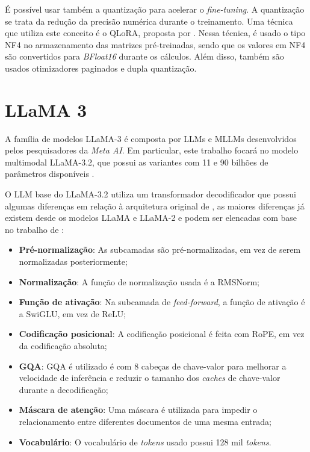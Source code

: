 
É possível usar também a quantização para acelerar o \textit{fine-tuning}. A quantização se trata da redução da precisão numérica durante o treinamento. Uma técnica que
utiliza este conceito é o \ac{QLoRA}, proposta por \textcite{qlora}. Nessa técnica, é usado o tipo \ac{NF4} no armazenamento das matrizes pré-treinadas, sendo que os
valores em \ac{NF4} são convertidos para \textit{BFloat16} durante os cálculos. Além disso, também são usados otimizadores paginados e dupla quantização.

\section{LLaMA 3}

A família de modelos \ac{LLaMA}-3 é composta por \acp{LLM} e \acp{MLLM} desenvolvidos pelos pesquisadores da \textit{Meta AI}. Em particular, este trabalho focará no
modelo multimodal \ac{LLaMA}-3.2, que possui as variantes com 11 e 90 bilhões de parâmetros disponíveis \cite{dubey2024llama}.

O \ac{LLM} base do \ac{LLaMA}-3.2 utiliza um transformador decodificador que possui algumas diferenças em relação à arquitetura original de \textcite{transformer}, as
maiores diferenças já existem desde os modelos \ac{LLaMA} e \ac{LLaMA}-2 e podem ser elencadas com base no trabalho de \textcite{touvron2023llama}:

\begin{itemize}
      \item \textbf{Pré-normalização}: As subcamadas são pré-normalizadas, em vez de serem normalizadas posteriormente;
      \item \textbf{Normalização}: A função de normalização usada é a \ac{RMSNorm};
      \item \textbf{Função de ativação}: Na subcamada de \textit{feed-forward}, a função de ativação é a \ac{SwiGLU}, em vez de \ac{ReLU};
      \item \textbf{Codificação posicional}: A codificação posicional é feita com \ac{RoPE}, em vez da codificação absoluta;
      \item \textbf{\acs{GQA}}: \ac{GQA} é utilizado é com 8 cabeças de chave-valor para melhorar a velocidade de inferência e reduzir o tamanho dos \textit{caches} de
            chave-valor durante a decodificação;
      \item \textbf{Máscara de atenção}: Uma máscara é utilizada para impedir o relacionamento entre diferentes documentos de uma mesma entrada;
      \item \textbf{Vocabulário}: O vocabulário de \textit{tokens} usado possui 128 mil \textit{tokens}.
\end{itemize}

